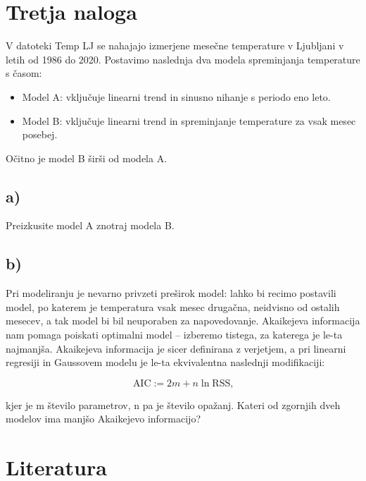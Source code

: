 \documentclass[12pt, a4paper]{article}
\begin{document}
\section{Tretja naloga}

V datoteki Temp LJ se nahajajo izmerjene mesečne temperature v Ljubljani v 
letih od 1986 do 2020. Postavimo naslednja dva modela spreminjanja temperature
s časom: 

\begin{itemize}
     
    \item Model A: vključuje linearni trend in sinusno nihanje s periodo eno 
        leto.
    \item Model B: vključuje linearni trend in spreminjanje temperature za 
        vsak mesec posebej.

\end{itemize}

Očitno je model B širši od modela A.

\subsection{a)}

Preizkusite model A znotraj modela B.

\subsection{b)}
Pri modeliranju je nevarno privzeti preširok model: lahko bi recimo postavili
model, po katerem je temperatura vsak mesec drugačna, neidvisno od ostalih
mesecev, a tak model bi bil neuporaben za napovedovanje. Akaikejeva 
informacija nam pomaga poiskati optimalni model – izberemo tistega, za katerega
je le-ta najmanjša. Akaikejeva informacija je sicer definirana z verjetjem, 
a pri linearni regresiji in Gaussovem modelu je le-ta ekvivalentna naslednji 
modifikaciji:

\[
    \text{AIC} := 2m + n \ln \text{RSS,}
    \]

kjer je m število parametrov, n pa je število opažanj. Kateri od zgornjih dveh
modelov ima manjšo Akaikejevo informacijo?



\section{Literatura}
\end{document}
